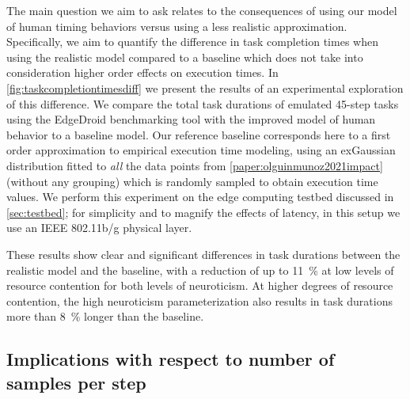 The main question we aim to ask relates to the consequences of using our model of human timing behaviors versus using a less realistic approximation.
Specifically, we aim to quantify the difference in task completion times when using the realistic model compared to a baseline which does not take into consideration higher order effects on execution times.
In \cref{fig:taskcompletiontimesdiff} we present the results of an experimental exploration of this difference.
We compare the total task durations of emulated \num{45}-step tasks using the EdgeDroid benchmarking tool with the improved model of human behavior to a baseline model.
Our reference baseline corresponds here to a first order approximation to empirical execution time modeling, using an \gls{exGaussian} distribution fitted to \emph{all} the data points from \cref{paper:olguinmunoz2021impact} (without any grouping) which is randomly sampled to obtain execution time values.
We perform this experiment on the edge computing testbed discussed in \cref{sec:testbed};
for simplicity and to magnify the effects of latency, in this setup we use an \acs{IEEE} \num{802.11}b/g physical layer.

These results show clear and significant differences in task durations between the realistic model and the baseline, with a reduction of up to \SI{11}{\percent} at low levels of resource contention for both levels of neuroticism.
At higher degrees of resource contention, the high neuroticism parameterization also results in task durations more than \SI{8}{\percent} longer than the baseline.


\subsection{Implications with respect to number of samples per step}

